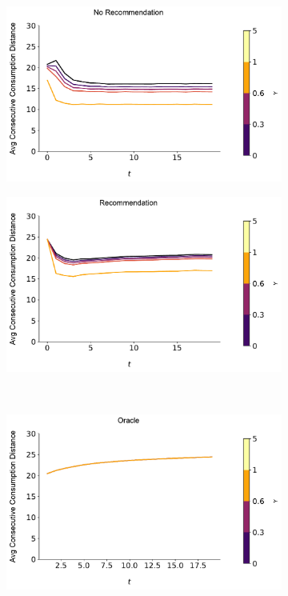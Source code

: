 \documentclass[format=acmsmall, review=true]{acmart}
\begin{document}
\begin{figure}[H]
\caption{Relationship between Local Consumption and $\gamma$, $N = 100$}
\begin{subfigure}{.45\textwidth}
\includegraphics[width=\linewidth]{figures/gamma_consumption_dist_N_100T_20.pdf}
\end{subfigure}
\begin{subfigure}{.45\textwidth}
\includegraphics[width=\linewidth]{figures/gamma_consumption_dist_N_100T_20_partial.pdf}
\end{subfigure}\\
\begin{subfigure}{.45\textwidth}
\includegraphics[width=\linewidth]{figures/gamma_consumption_dist_N_100T_20_omni.pdf}\\

\end{subfigure}
\end{figure}
\end{document}
